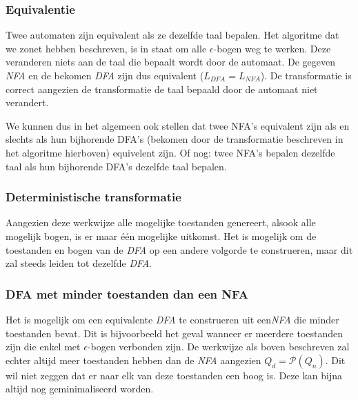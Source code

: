 \subsubsection*{Equivalentie}
Twee automaten zijn equivalent als ze dezelfde taal bepalen. Het algoritme dat we zonet hebben beschreven, is in staat om alle $\epsilon$-bogen weg te werken. Deze veranderen niets aan de taal die bepaalt wordt door de automaat. De gegeven \emph{NFA} en de bekomen \emph{DFA} zijn dus equivalent ($L_{DFA} = L_{NFA}$).  De transformatie is correct aangezien de transformatie de taal bepaald door de automaat niet verandert.

We kunnen dus in het algemeen ook stellen dat twee NFA's equivalent zijn als en slechts als hun bijhorende DFA's (bekomen door de transformatie beschreven in het algoritme hierboven) equivelent zijn. Of nog: twee NFA's bepalen dezelfde taal als hun bijhorende DFA's dezelfde taal bepalen.

\subsubsection*{Deterministische transformatie}
Aangezien deze werkwijze alle mogelijke toestanden genereert, alsook alle mogelijk bogen, is er maar \'e\'en mogelijke uitkomst. Het is mogelijk om de toestanden en bogen van de \emph{DFA} op een andere volgorde te construeren, maar dit zal steeds leiden tot dezelfde \emph{DFA}.

\subsubsection*{DFA met minder toestanden dan een NFA}

Het is mogelijk om een equivalente \emph{DFA} te construeren uit een\emph{NFA} die minder toestanden bevat. Dit is bijvoorbeeld het geval wanneer er meerdere toestanden zijn die enkel met $\epsilon$-bogen verbonden zijn. De werkwijze als boven beschreven zal echter altijd meer toestanden hebben dan de \emph{NFA} aangezien $Q_d = \mathcal{P}(Q_n)$. Dit wil niet zeggen dat er naar elk van deze toestanden een boog is. Deze kan bijna altijd nog geminimaliseerd worden.
